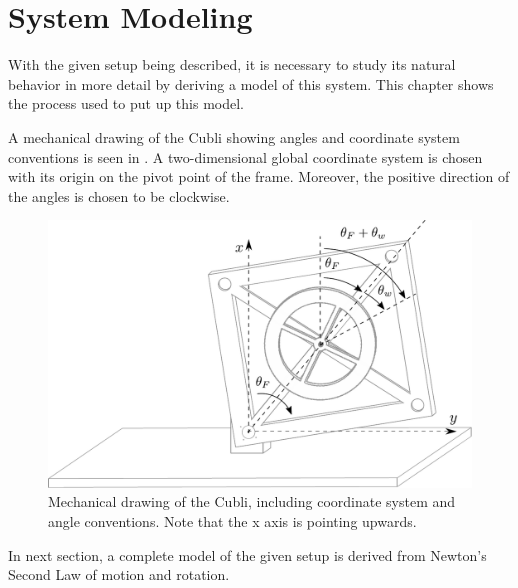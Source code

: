 \chapter{System Modeling}
With the given setup being described, it is necessary to study its natural behavior in more detail by deriving a model of this system. This chapter shows the process used to put up this model.

A mechanical drawing of the Cubli showing angles and coordinate system conventions is seen in . A two-dimensional global coordinate system is chosen with its origin on the pivot point of the frame. Moreover, the positive direction of the angles is chosen to be clockwise.

\begin{figure}[H]
 \centering
 \includegraphics[scale=0.6]{figures/mechanicalSystem}
 \caption{Mechanical drawing of the Cubli, including coordinate system and angle conventions. Note that the x axis is pointing upwards.}
 \label{cubliMechanical}
\end{figure}

In next section, a complete model of the given setup is derived from Newton's Second Law of motion and rotation.